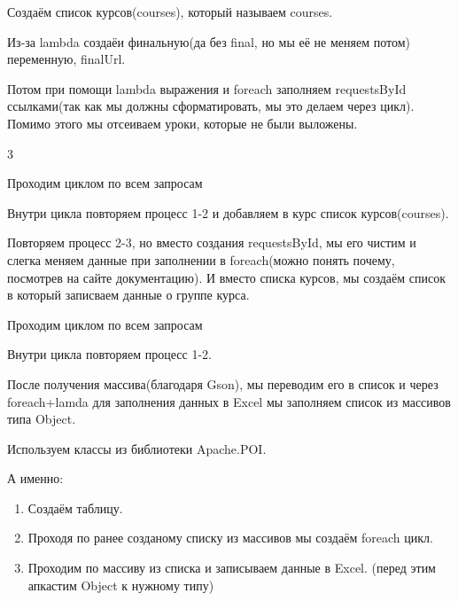 \documentclass[a4paper, 12pt]{article}
\begin{document}
	Создаём список курсов(courses), который называем courses.
	
	Из-за lambda создаёи финальную(да без final, но мы её не меняем потом) переменную, finalUrl.
	
	Потом при помощи lambda выражения и foreach заполняем requestsById ссылками(так как мы должны сформатировать, мы это делаем через цикл). Помимо этого мы отсеиваем уроки, которые не были выложены.
	
	3
	
	Проходим циклом по всем запросам
	
	Внутри цикла повторяем процесс 1-2 и добавляем в курс список курсов(courses).
	
	Повторяем процесс 2-3, но вместо создания requestsById, мы его чистим и слегка меняем данные при заполнении в foreach(можно понять почему, посмотрев на сайте документацию). И вместо списка курсов, мы создаём список в который записваем данные о группе курса.
	
	Проходим циклом по всем запросам
	
	Внутри цикла повторяем процесс 1-2.
	
	После получения массива(благодаря Gson), мы переводим его в список и через foreach+lamda для заполнения данных в Excel мы заполняем список из массивов типа Object.
	
	Используем классы из библиотеки Apache.POI.
	
	А именно:
	\begin{enumerate}
		\item Создаём таблицу.
		\item Проходя по ранее созданому списку из массивов мы создаём foreach цикл.
		\item Проходим по массиву из списка и записываем данные в Excel. (перед этим апкастим Object к нужному типу)
	\end{enumerate}
\end{document}
